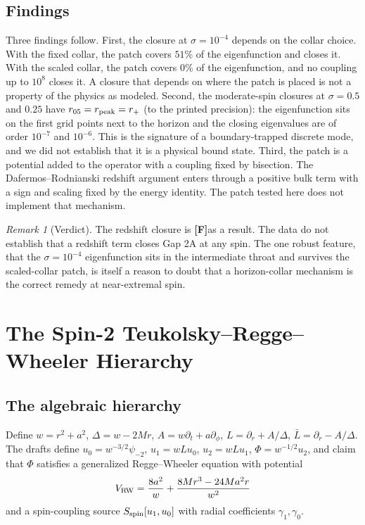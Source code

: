 \documentclass[11pt,a4paper]{article}
\newcommand{\FF}{\textcolor{ff}{\textbf{[F]}}}
\theoremstyle{remark}
\newtheorem{remark}[theorem]{Remark}
\theoremstyle{definition}
\begin{document}
\subsection{Findings}

Three findings follow. First, the closure at $\sigma = 10^{-4}$ depends on the collar choice. With the fixed collar, the patch covers $51\%$ of the eigenfunction and closes it. With the scaled collar, the patch covers $0\%$ of the eigenfunction, and no coupling up to $10^8$ closes it. A closure that depends on where the patch is placed is not a property of the physics as modeled. Second, the moderate-spin closures at $\sigma = 0.5$ and $0.25$ have $r_{05} = r_{\rm peak} = r_+$ (to the printed precision): the eigenfunction sits on the first grid points next to the horizon and the closing eigenvalues are of order $10^{-7}$ and $10^{-6}$. This is the signature of a boundary-trapped discrete mode, and we did not establish that it is a physical bound state. Third, the patch is a potential added to the operator with a coupling fixed by bisection. The Dafermos--Rodnianski redshift argument enters through a positive bulk term with a sign and scaling fixed by the energy identity. The patch tested here does not implement that mechanism.

\begin{remark}[Verdict]
The redshift closure is \FF as a result. The data do not establish that a redshift term closes Gap 2A at any spin. The one robust feature, that the $\sigma=10^{-4}$ eigenfunction sits in the intermediate throat and survives the scaled-collar patch, is itself a reason to doubt that a horizon-collar mechanism is the correct remedy at near-extremal spin.
\end{remark}

\section{The Spin-2 Teukolsky--Regge--Wheeler Hierarchy}
\label{sec:spin2}

\subsection{The algebraic hierarchy}

Define $w = r^2 + a^2$, $\Delta = w - 2Mr$, $A = w\partial_t + a\partial_\phi$, $L = \partial_r + A/\Delta$, $\bar L = \partial_r - A/\Delta$. The drafts define $u_0 = w^{-3/2}\psi_{-2}$, $u_1 = wLu_0$, $u_2 = wLu_1$, $\Phi = w^{-1/2}u_2$, and claim that $\Phi$ satisfies a generalized Regge--Wheeler equation with potential
\[
V_{\rm RW} = \frac{8a^2}{w} + \frac{8Mr^3 - 24Ma^2r}{w^2}
\]
and a spin-coupling source $S_{\rm spin}[u_1,u_0]$ with radial coefficients $\gamma_1,\gamma_0$.
\end{document}
